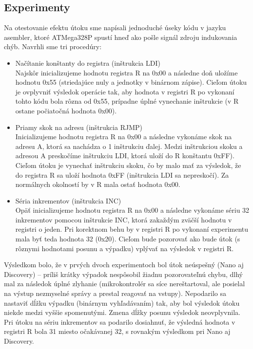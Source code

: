 \subsection{Experimenty}
Na otestovanie efektu útoku sme napísali jednoduché úseky kódu v jazyku asembler, ktoré ATMega328P spustí hneď ako pošle signál zdroju indukovania chýb. Navrhli sme tri procedúry:
\begin{itemize}
    \item Načítanie konštanty do registra (inštrukcia LDI)\\
    Najskôr inicializujeme hodnotu registra R na 0x00 a následne doň uložíme hodnotu 0x55 (striedajúce nuly a jednotky v binárnom zápise). Cieľom útoku je ovplyvniť výsledok operácie tak, aby hodnota v registri R po vykonaní tohto kódu bola rôzna od 0x55, prípadne úplné vynechanie inštrukcie (v R ostane počiatočná hodnota 0x00).
    \item Priamy skok na adresu (inštrukcia RJMP)\\
    Inicializujeme hodnotu registra R na 0x00 a následne vykonáme skok na adresu A, ktorá sa nachádza o 1 inštrukciu ďalej. Medzi inštrukciou skoku a adresou A preskočíme inštrukciu LDI, ktorá uloží do R konštantu 0xFF). Cieľom útoku je vynechať inštrukciu skoku, čo by malo mať za výsledok, že do registra R sa uloží hodnota 0xFF (inštrukcia LDI sa nepreskočí). Za normálnych okolností by v R mala ostať hodnota 0x00.
    \item Séria inkrementov (inštrukcia INC)\\
    Opäť inicializujeme hodnotu registra R na 0x00 a následne vykonáme sériu 32 inkrementov pomocou inštrukcie INC, ktorá zakaždým zväčší hodnotu v registri o jeden. Pri korektnom behu by v registri R po vykonaní experimentu mala byť teda hodnota 32 (0x20). Cieľom bude pozorovať ako bude útok (s rôznymi hodnotami posunu a výpadku) vplývať na výsledok v registri R.
\end{itemize}

Výsledkom bolo, že v prvých dvoch experimentoch bol útok neúspešný (Nano aj Discovery) -- príliš krátky výpadok nespôsobil žiadnu pozorovateľnú chybu, dlhý mal za následok úplné zlyhanie (mikrokontrolér sa síce nereštartoval, ale posielal na výstup nezmyselné správy a prestal reagovať na vstupy). Nepodarilo sa nastaviť dĺžku výpadku (binárnym vyhľadávaním) tak, aby bol výsledok útoku niekde medzi vyššie spomenutými. Zmena dĺžky posunu výsledok neovplyvnila. Pri útoku na sériu inkrementov sa podarilo dosiahnuť, že výsledná hodnota v registri R bola 31 miesto očakávanej 32, s rovnakým výsledkom pri Nano aj Discovery.

